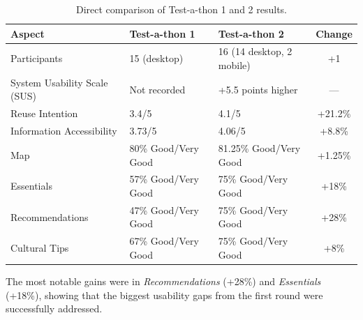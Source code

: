 \begin{table}[H]
\centering
\small
\caption{Direct comparison of Test-a-thon 1 and 2 results.}
\label{tab:testathon-comparison}
\begin{tabular}{|l|p{4cm}|p{4cm}|c|}
\hline
\textbf{Aspect} & \textbf{Test-a-thon 1} & \textbf{Test-a-thon 2} & \textbf{Change} \\
\hline
Participants & 15 (desktop) & 16 (14 desktop, 2 mobile) & +1 \\
\hline
System Usability Scale (SUS) & Not recorded & +5.5 points higher & — \\
\hline
Reuse Intention & 3.4/5 & 4.1/5 & +21.2\% \\
\hline
Information Accessibility & 3.73/5 & 4.06/5 & +8.8\% \\
\hline
Map & 80\% Good/Very Good & 81.25\% Good/Very Good & +1.25\% \\
\hline
Essentials & 57\% Good/Very Good & 75\% Good/Very Good & +18\% \\
\hline
Recommendations & 47\% Good/Very Good & 75\% Good/Very Good & +28\% \\
\hline
Cultural Tips & 67\% Good/Very Good & 75\% Good/Very Good & +8\% \\
\hline
\end{tabular}
\end{table}

\noindent The most notable gains were in \textit{Recommendations} (+28\%) and \textit{Essentials} (+18\%), 
showing that the biggest usability gaps from the first round were successfully addressed.


